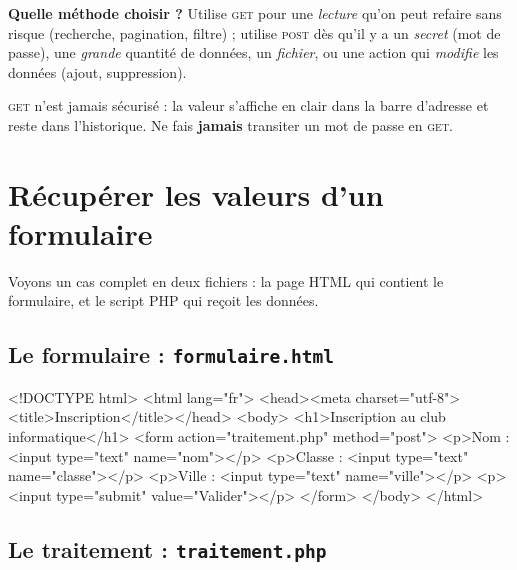 \begin{methode}
\textbf{Quelle méthode choisir ?} Utilise \textsc{get} pour une \emph{lecture}
qu'on peut refaire sans risque (recherche, pagination, filtre) ; utilise
\textsc{post} dès qu'il y a un \emph{secret} (mot de passe), une \emph{grande}
quantité de données, un \emph{fichier}, ou une action qui \emph{modifie} les
données (ajout, suppression).
\end{methode}

\begin{attention}
\textsc{get} n'est jamais sécurisé : la valeur s'affiche en clair dans la barre
d'adresse et reste dans l'historique. Ne fais \textbf{jamais} transiter un mot de
passe en \textsc{get}.
\end{attention}

\section{Récupérer les valeurs d'un formulaire}

Voyons un cas complet en deux fichiers : la page HTML qui contient le formulaire,
et le script PHP qui reçoit les données.

\subsection{Le formulaire : \texttt{formulaire.html}}

\begin{codehtml}
<!DOCTYPE html>
<html lang="fr">
<head><meta charset="utf-8"><title>Inscription</title></head>
<body>
  <h1>Inscription au club informatique</h1>
  <form action="traitement.php" method="post">
    <p>Nom :    <input type="text" name="nom"></p>
    <p>Classe : <input type="text" name="classe"></p>
    <p>Ville :  <input type="text" name="ville"></p>
    <p><input type="submit" value="Valider"></p>
  </form>
</body>
</html>
\end{codehtml}

\subsection{Le traitement : \texttt{traitement.php}}


